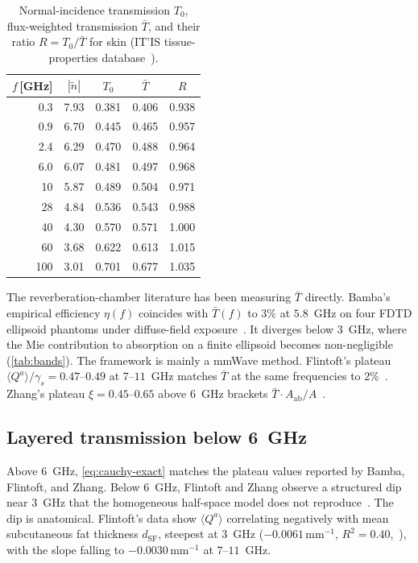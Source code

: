 \documentclass[journal,twocolumn,10pt]{IEEEtran}
\theoremstyle{plain}
\newcommand{\Aab}{A_{\mathrm{ab}}}
\newcommand{\Tbar}{\bar{T}}
\newcommand{\ntilde}{\tilde{n}}
\begin{document}
\begin{table}[!t]
\centering
\caption{Normal-incidence transmission $T_0$, flux-weighted
transmission $\Tbar$, and their ratio $R = T_0/\Tbar$ for skin
(IT'IS tissue-properties database~\cite{ITISv5,Gabriel1996}).}\label{tab:Tbar}
\begin{tabular}{rcccc}
\toprule
$f$\,[GHz] & $|\ntilde|$ & $T_0$ & $\Tbar$ & $R$ \\
\midrule
0.3 & 7.93 & 0.381 & 0.406 & 0.938 \\
0.9 & 6.70 & 0.445 & 0.465 & 0.957 \\
2.4 & 6.29 & 0.470 & 0.488 & 0.964 \\
6.0 & 6.07 & 0.481 & 0.497 & 0.968 \\
10  & 5.87 & 0.489 & 0.504 & 0.971 \\
28  & 4.84 & 0.536 & 0.543 & 0.988 \\
40  & 4.30 & 0.570 & 0.571 & 1.000 \\
60  & 3.68 & 0.622 & 0.613 & 1.015 \\
100 & 3.01 & 0.701 & 0.677 & 1.035 \\
\bottomrule
\end{tabular}
\end{table}

The reverberation-chamber literature has been measuring $\Tbar$
directly. Bamba's empirical efficiency $\eta(f)$
coincides with $\Tbar(f)$ to $3\%$ at $5.8$~GHz on four FDTD ellipsoid
phantoms under diffuse-field exposure~\cite{Bamba2014}. It diverges below
$3$~GHz, where the Mie contribution to absorption on a finite
ellipsoid becomes non-negligible (\cref{tab:bands}). The framework
is mainly a mmWave method.
Flintoft's plateau $\langle Q^a\rangle/\gamma_s = 0.47$--$0.49$
at $7$--$11$~GHz matches $\Tbar$ at the same frequencies to $2\%$~\cite{Flintoft2014}.
Zhang's plateau $\xi = 0.45$--$0.65$ above $6$~GHz brackets
$\Tbar\cdot\Aab/A$~\cite{Zhang2017thesis}.

\subsection{Layered transmission below 6~GHz}\label{subsec:fp}

Above $6$~GHz, \eqref{eq:cauchy-exact} matches the plateau values
reported by Bamba, Flintoft, and Zhang. Below $6$~GHz, Flintoft and
Zhang observe a structured dip near $3$~GHz that the homogeneous
half-space model does not reproduce~\cite{Flintoft2014,Zhang2017thesis}. The
dip is anatomical. Flintoft's data show $\langle Q^a\rangle$
correlating negatively with mean subcutaneous fat
thickness $d_{\mathrm{SF}}$, steepest at $3$~GHz
($-0.0061\,\mathrm{mm}^{-1}$, $R^2 = 0.40$,~\cite[Table~6]{Flintoft2014}),
with the slope falling to $-0.0030\,\mathrm{mm}^{-1}$ at $7$--$11$~GHz.
\end{document}
